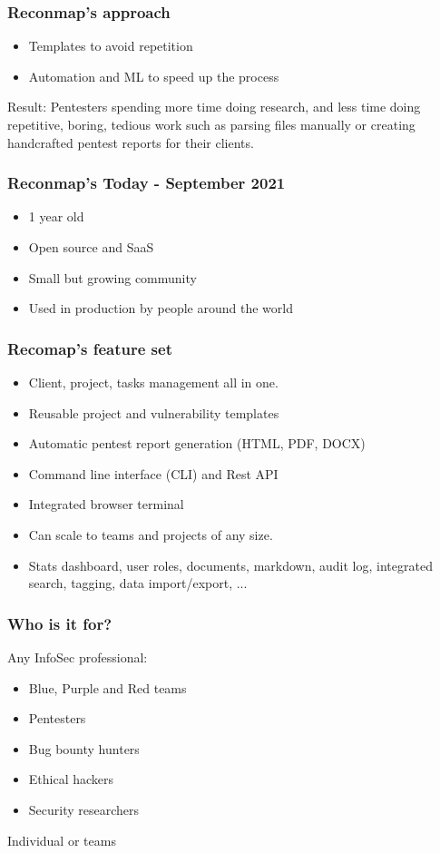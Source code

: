 \documentclass{beamer}
\begin{document}
\begin{frame}
	\frametitle{Reconmap's approach}
	
	\begin{itemize}
		\item Templates to avoid repetition
		\item Automation and ML to speed up the process
	\end{itemize}
	
	\begin{block}{Result:}
		Pentesters spending more time doing research, and less time doing repetitive, boring, tedious work such as parsing files manually or creating handcrafted pentest reports for their clients.	
	\end{block}
\end{frame}


\begin{frame}
	\frametitle{Reconmap's Today - September 2021}
	
	\begin{itemize}
		\item 1 year old
		\item Open source and SaaS
		\item Small but growing community
		\item Used in production by people around the world
	\end{itemize}
\end{frame}

\begin{frame}{}
	\frametitle{Recomap's feature set}
	
    \begin{itemize}
        \item Client, project, tasks management all in one.
        \item Reusable project and vulnerability templates
        \item Automatic pentest report generation (HTML, PDF, DOCX)
        \item Command line interface (CLI) and Rest API
        \item Integrated browser terminal
        \item Can scale to teams and projects of any size.
        \item Stats dashboard, user roles, documents, markdown, audit log, integrated search, tagging, data import/export, ...
    \end{itemize}
\end{frame}

\begin{frame}
	\frametitle{Who is it for?}
	
	Any InfoSec professional:
	\begin{itemize}
		\item Blue, Purple and Red teams
		\item Pentesters
		\item Bug bounty hunters
		\item Ethical hackers
		\item Security researchers
	\end{itemize}
	\bigskip
	Individual or teams
\end{frame}
\end{document}
